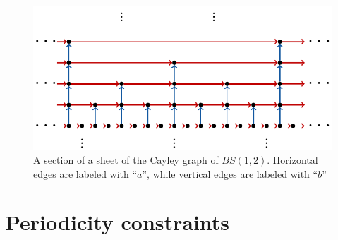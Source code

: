 \documentclass[cupthm,crop,info]{CUP-JNL-ETS}%
\theoremstyle{cupplain}
\theoremstyle{cupdefinition}
\theoremstyle{cupremark}
\theoremstyle{cupproof}
\numberwithin{equation}{section}
\begin{document}
\begin{figure}[h]
	\centering
\includegraphics[scale=0.9]{bs_onesheet.pdf}
	\caption{A section of a sheet of the Cayley graph of $BS(1,2)$.  Horizontal edges are labeled with ``$a$'', while vertical edges are labeled with ``$b$''}
	\label{fig:bssheet}
\end{figure}



\section{Periodicity constraints}\label{section:weak_periodicity}
\end{document}
